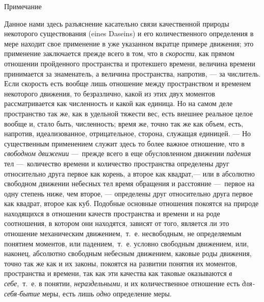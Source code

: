 {\centering
Примечание
\par}

Данное нами здесь разъяснение касательно связи качественной природы
некоторого существования (eines Daseins) и его количественного определения
в мере находит свое применение в уже указанном вкратце примере движения;
это применение заключается прежде всего в том, что в
{\em скорости}, как прямом отношении пройденного
пространства и протекшего времени, величина времени принимается за
знаменатель, а величина пространства, напротив, — за числитель. Если
скорость есть вообще лишь отношение между пространством и временем
некоторого движения, то безразлично, какой из этих двух моментов
рассматривается как численность и какой как единица. Но на самом деле
пространство так же, как в удельной тяжести вес, есть внешнее реальное
целое вообще и, стало быть, численность; время же, точно так же как объем,
есть, напротив, идеализованное, отрицательное, сторона, служащая единицей.
— Но существенным применением служит здесь то более важное отношение, что в
{\em свободном движении} —~прежде всего в еще
обусловленном движении {\em падения} тел —~количество
времени и количество пространства определены друг относительно друга первое
как корень, а второе как квадрат,— или в абсолютно свободном движении
небесных тел время обращения и расстояние —~первое на одну степень ниже,
чем второе, — определены друг относительно друга первое как квадрат, второе
как куб. Подобные основные отношения покоятся на природе находящихся в
отношении качеств пространства и времени и на роде соотношения, в котором
они находятся, зависят от того, является ли это отношение механическим
движением,~т.~е. несвободным, не определяемым понятием моментов, или
падением,~т.~е. условно свободным движением, или, наконец, абсолютно
свободным небесным движением, каковые роды движения, точно так же как и их
законы, покоятся на развитии понятия их моментов, пространства и времени,
так как эти качества как таковые оказываются {\em в
себе},~т.~е. в понятии, {\em нераздельными}, и их
количественное отношение есть {\em для-себя-бытие}
меры, есть лишь {\em одно} определение меры.

